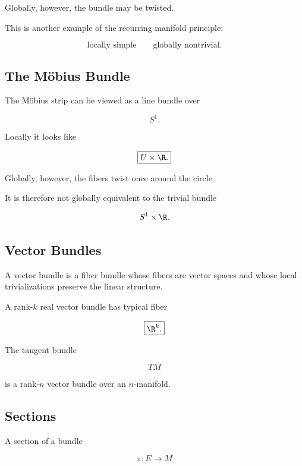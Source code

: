 Globally, however, the bundle may be twisted.

This is another example of the recurring manifold principle:

\[
\boxed{
\text{locally simple}
\qquad
\text{globally nontrivial}.
}
\]

\subsection{The M\"obius Bundle}
\label{subsec:mobius-bundle}

The M\"obius strip can be viewed as a line bundle over

\[
S^1.
\]

Locally it looks like

\[
\boxed{
U\times\R.
}
\]

Globally, however, the fibers twist once around the circle.

It is therefore not globally equivalent to the trivial bundle

\[
S^1\times\R.
\]

\subsection{Vector Bundles}
\label{subsec:vector-bundles-manifolds}

A vector bundle is a fiber bundle whose fibers are vector spaces and whose
local trivializations preserve the linear structure.

A rank-\(k\) real vector bundle has typical fiber

\[
\boxed{
\R^k.
}
\]

The tangent bundle

\[
TM
\]

is a rank-\(n\) vector bundle over an \(n\)-manifold.

\subsection{Sections}
\label{subsec:bundle-sections}

A section of a bundle

\[
\pi:E\to M
\]

